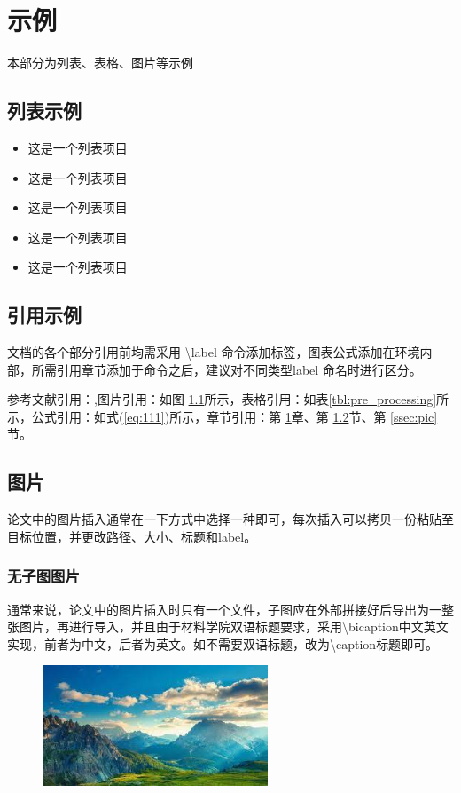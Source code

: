 \chapter{示例}
\label{chp:example}
本部分为列表、表格、图片等示例
\section{列表示例}
\begin{itemize}[leftmargin=*]
	\item 这是一个列表项目
	\item 这是一个列表项目
	\item 这是一个列表项目
	\item 这是一个列表项目
	\item 这是一个列表项目
\end{itemize}
\section{引用示例}
\label{sec:ref}
文档的各个部分引用前均需采用 \textbackslash label 命令添加标签，图表公式添加在环境内部，所需引用章节添加于命令之后，建议对不同类型label 命名时进行区分。

参考文献引用：\cite{liu_approaching_2018},图片引用：如图 \ref{picexam}所示，表格引用：如表\ref{tbl:pre_processing}所示，公式引用：如式(\ref{eq:111})所示，章节引用：第 \ref{chp:example}章、第  \ref{sec:ref}节、第 \ref{ssec:pic}节。

\section{图片}
论文中的图片插入通常在一下方式中选择一种即可，每次插入可以拷贝一份粘贴至目标位置，并更改路径、大小、标题和label。
\subsection{无子图图片}
通常来说，论文中的图片插入时只有一个文件，子图应在外部拼接好后导出为一整张图片，再进行导入，并且由于材料学院双语标题要求，采用\textbackslash bicaption{中文}{英文}实现，前者为中文，后者为英文。如不需要双语标题，改为\textbackslash caption{标题}即可。
\label{ssec:pic}
\begin{figure}[H]
	\centering
	\includegraphics[width=0.6\textwidth]{figure/chapter1/Omni.jpg}%
	\label{picexam}%
\end{figure}

